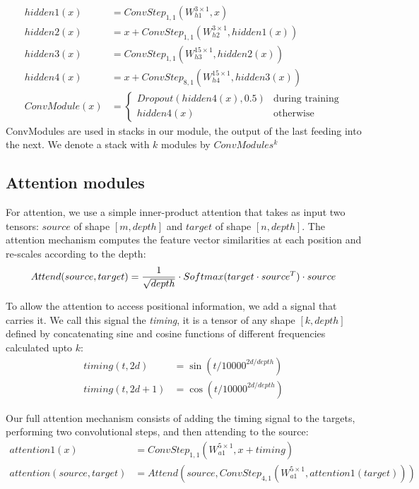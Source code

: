 \documentclass{article}
\newcommand\cs[3]{ConvStep_{#1,#2}(#3)}
\begin{document}
\begin{align*}
    hidden1(x) &= \cs{1}{1}{W^{3 \times 1}_{h1}, x}\\
    hidden2(x) &= x + \cs{1}{1}{W^{3 \times 1}_{h2}, hidden1(x)}\\
    hidden3(x) &= \cs{1}{1}{W^{15 \times 1}_{h3}, hidden2(x)}\\
    hidden4(x) &= x + \cs{8}{1}{W^{15 \times 1}_{h4}, hidden3(x)}\\
    ConvModule(x) &= \begin{cases}
                Dropout(hidden4(x), 0.5) & \text{during training}\\
                hidden4(x) & \text{otherwise}
              \end{cases}
\end{align*}
ConvModules are used in stacks in our module, the output of the last feeding into the next.
We denote a stack with \(k\) modules by \(ConvModules^k\)

\subsection{Attention modules}\label{attnmodule}

For attention, we use a simple inner-product attention that takes as input two tensors: \(source\) of shape \([m, depth]\) and \(target\) of shape \([n, depth]\). The attention mechanism computes the feature vector similarities at each position and re-scales according to the depth:
\[
    Attend(source, target) = \frac{1}{\sqrt{depth}} \cdot Softmax(target \cdot source^{T}) \cdot source\\
\]

To allow the attention to access positional information, we add a signal that carries it.
We call this signal the \emph{timing}, it is a tensor of any shape \([k, depth]\) defined
by concatenating sine and cosine functions of different frequencies calculated upto $k$:
\begin{align*}
    timing{(t, 2d)}   &= \sin(t / 10000^{2d/depth}) \\
    timing{(t, 2d+1)} &= \cos(t / 10000^{2d/depth})
\end{align*}

Our full attention mechanism consists of adding the timing signal to the targets,
performing two convolutional steps, and then attending to the source:
\begin{align*}
    attention1(x) &= \cs{1}{1}{W^{5 \times 1}_{a1}, x + timing}\\
    attention(source, target) &= Attend(source, \cs{4}{1}{W^{5 \times 1}_{a1}, attention1(target)})
\end{align*}
\end{document}
